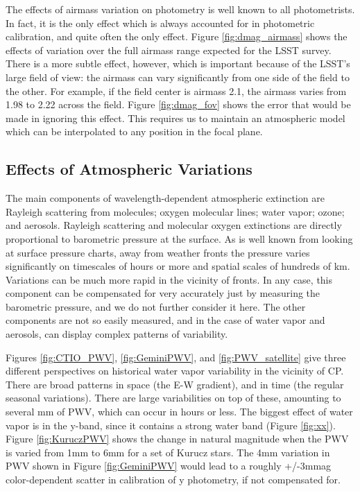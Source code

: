 \documentclass[12pt,preprint]{aastex}
\begin{document}
The effects of airmass variation on photometry is well known to all photometrists.   In fact, it is the only effect which is
always accounted for in photometric calibration, and quite often the only effect.   Figure \ref{fig:dmag_airmass} shows the effects
of variation over the full airmass range expected for the LSST survey.  There is a more subtle effect, however, which is important
because of the LSST's large field of view: the airmass can vary significantly from one side of the field to the other. For example,
if the field center is airmass 2.1, the airmass varies from 1.98 to 2.22 across the field.  Figure \ref{fig:dmag_fov} shows the error
that would be made in ignoring this effect.  This requires us to maintain an atmospheric model which can be interpolated
to any position in the focal plane.

\subsection{Effects of Atmospheric Variations}

The main components of wavelength-dependent atmospheric extinction are Rayleigh scattering from molecules; oxygen molecular lines; water vapor; ozone; and aerosols.   Rayleigh scattering and molecular oxygen extinctions are directly proportional to barometric pressure at the surface.  As is well known from looking at surface pressure charts, away from weather fronts the pressure varies significantly on timescales of hours or more and spatial scales of hundreds of km.  Variations can be much more rapid in the vicinity of fronts.   In any case, this component can be compensated for very accurately just by measuring the barometric pressure, and we do not further consider it here.  The other components are not so easily measured, and in the case of water vapor and aerosols, can display complex patterns of variability.  

Figures \ref{fig:CTIO_PWV}, \ref{fig:GeminiPWV}, and \ref{fig:PWV_satellite} give three different perspectives on historical water vapor variability in the vicinity of CP.  There are broad patterns in space (the E-W gradient), and in time (the regular seasonal variations).  There are large variabilities on top of these, amounting to several mm of PWV, which can occur in hours or less.   The biggest effect of water vapor is in the y-band, since it contains a strong water band (Figure \ref{fig:xx}).   Figure \ref{fig:KuruczPWV} shows the change in natural magnitude when the PWV is varied from 1mm to 6mm for a set of Kurucz stars.  The 4mm variation in PWV shown in Figure \ref{fig:GeminiPWV} would lead to a roughly +/-3mmag color-dependent scatter in calibration of y photometry, if not compensated for. 
\end{document}
